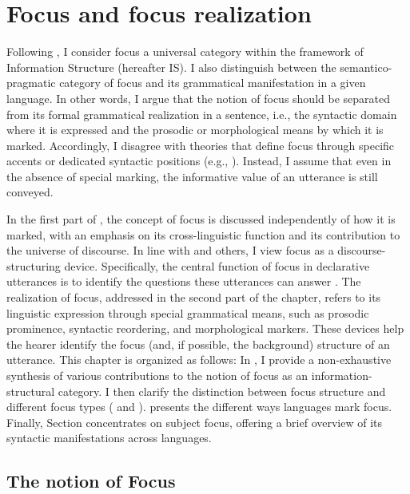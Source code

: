 \chapter{Focus and focus realization} \label{focusandfocusrealization} \label{sec:1}

Following \textcite{zimmermann2011focus}, I consider focus a universal category within the framework of Information Structure (hereafter IS). I also distinguish between the semantico-pragmatic category of focus and its grammatical manifestation in a given language.
In other words, I argue that the notion of focus should be separated from its formal grammatical realization in a sentence, i.e., the syntactic domain where it is expressed and the prosodic or morphological means by which it is marked. Accordingly, I disagree with theories that define focus through specific accents or dedicated syntactic positions (e.g., \cite{chomsky1970some, rizzi1997fine, brody1990some}). Instead, I assume that even in the absence of special marking, the informative value of an utterance is still conveyed.

In the first part of , the concept of focus is discussed independently of how it is marked, with an emphasis on its cross-linguistic function and its contribution to the universe of discourse. In line with \textcite{roberts1996information} and others, I view focus as a discourse-structuring device. Specifically, the central function of focus in declarative utterances is to identify the questions these utterances can answer \parencite{roberts1996information, buring2003d, beaver2009sense}.
The realization of focus, addressed in the second part of the chapter, refers to its linguistic expression through special grammatical means, such as prosodic prominence, syntactic reordering, and morphological markers. These devices help the hearer identify the focus (and, if possible, the background) structure of an utterance.
This chapter is organized as follows: In , I provide a non-exhaustive synthesis of various contributions to the notion of focus as an information-structural category. I then clarify the distinction between focus structure and different focus types ( and ).  presents the different ways languages mark focus. Finally, Section  concentrates on subject focus, offering a brief overview of its syntactic manifestations across languages.

\section{The notion of Focus} \label{sub:2.1}


